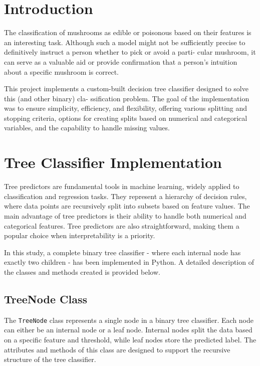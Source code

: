 \documentclass{article}
\begin{document}
\tableofcontents

\section{Introduction}

The classification of mushrooms as edible or poisonous based on their features is an interesting task. Although such a model might not be sufficiently precise to definitively instruct a person whether to pick or avoid a parti- cular mushroom, it can serve as a valuable aid or provide confirmation that a person's intuition about a specific mushroom is correct.

This project implements a custom-built decision tree classifier designed to solve this (and other binary) cla- ssification problem. The goal of the implementation was to ensure simplicity, efficiency, and flexibility, offering various splitting and stopping criteria, options for creating splits based on numerical and categorical variables, and the capability to handle missing values.

\section{Tree Classifier Implementation}

Tree predictors are fundamental tools in machine learning, widely applied to classification and regression tasks. They represent a hierarchy of decision rules, where data points are recursively split into subsets based on feature values. The main advantage of tree predictors is their ability to handle both numerical and categorical features. Tree predictors are also straightforward, making them a popular choice when interpretability is a priority.

In this study, a complete binary tree classifier - where each internal node has exactly two children - has been implemented in Python. A detailed description of the classes and methods created is provided below.

\subsection{TreeNode Class}

The \texttt{TreeNode} class represents a single node in a binary tree classifier. Each node can either be an internal node or a leaf node. Internal nodes split the data based on a specific feature and threshold, while leaf nodes store the predicted label. The attributes and methods of this class are designed to support the recursive structure of the tree classifier.
\end{document}
